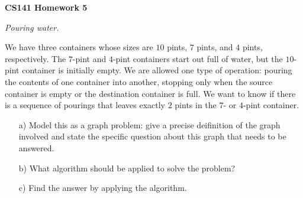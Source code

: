 \documentclass{article}
\begin{document}
\centerline{\large \bf CS141 Homework 5}

\vspace{0.5in}




\begin{problem} \textit{Pouring water.}

We have three containers whose sizes are $10$ pints, $7$ pints, and $4$ pints, respectively.
The $7$-pint and $4$-pint containers start out full of water, but the $10$-pint container is initially empty. We are allowed one type of operation: pouring the contents of one container into another, stopping only when the source container is empty or the destination container is full. We want to know if there is a sequence of pourings that leaves exactly $2$ pints in the $7$- or $4$-pint container.

\begin{itemize}
	\item[a)] Model this as a graph problem: give a precise deifinition of the graph involved and state the specific question about this graph that needs to be answered.
	\item[b)] What algorithm should be applied to solve the problem?
	\item[c)] Find the answer by applying the algorithm.
\end{itemize}

\end{problem}
\end{document}
